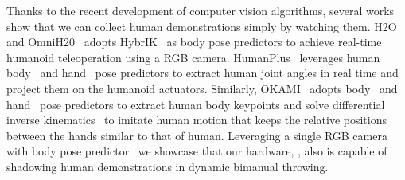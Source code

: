 Thanks to the recent development of computer vision algorithms, several works show that we can collect human demonstrations simply by watching them. H2O~\cite{h2o} and OmniH20~\cite{omnih2o} adopts HybrIK~\cite{hybrik} as body pose predictors to achieve real-time humanoid teleoperation using a RGB camera. HumanPlus~\cite{humanplus} leverages human body~\cite{wham} and hand~\cite{hamer} pose predictors to extract human joint angles in real time and project them on the humanoid actuators. Similarly, OKAMI~\cite{okami} adopts body~\cite{slahmr} and hand~\cite{hamer} pose predictors to extract human body keypoints and solve differential inverse kinematics~\cite{pink} to imitate human motion that keeps the relative positions between the hands similar to that of human. Leveraging a single RGB camera with body pose predictor~\cite{wham} we showcase that our hardware, \robot, also is capable of shadowing human demonstrations in dynamic bimanual throwing.